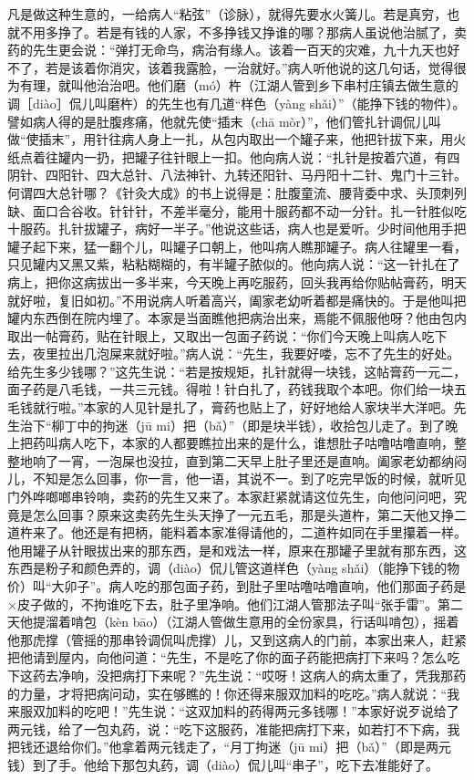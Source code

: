 \documentclass[12pt,UTF8]{ctexbook}
\begin{document}
凡是做这种生意的，一给病人“粘弦”（诊脉），就得先要水火簧儿。若是真穷，也就不用多挣了。若是有钱的人家，不多挣钱又挣谁的哪？那病人虽说他治腻了，卖药的先生更会说：“弹打无命鸟，病治有缘人。该着一百天的灾难，九十九天也好不了，若是该着你消灾，该着我露脸，一治就好。”病人听他说的这几句话，觉得很为有理，就叫他治治吧。他们磨（mó）杵（江湖人管到乡下串村庄镇去做生意的调［diào］侃儿叫磨杵）的先生也有几道“样色（yàng shǎi）”（能挣下钱的物件）。譬如病人得的是肚腹疼痛，他就先使“插末（chā mòr）”，他们管扎针调侃儿叫做“使插末”，用针往病人身上一扎，从包内取出一个罐子来，他把针拔下来，用火纸点着往罐内一扔，把罐子往针眼上一扣。他向病人说：“扎针是按着穴道，有四阴针、四阳针、四大总针、八法神针、九转还阳针、马丹阳十二针、鬼门十三针。何谓四大总针哪？《针灸大成》的书上说得是：肚腹童流、腰背委中求、头顶刺列缺、面口合谷收。针针针，不差半毫分，能用十服药都不动一分针。扎一针胜似吃十服药。扎针拔罐子，病好一半子。”他说这些话，病人也是爱听。少时间他用手把罐子起下来，猛一翻个儿，叫罐子口朝上，他叫病人瞧那罐子。病人往罐里一看，只见罐内又黑又紫，粘粘糊糊的，有半罐子脓似的。他向病人说：“这一针扎在了病上，把你这病拔出一多半来，今天晚上再吃服药，回头我再给你贴帖膏药，明天就好啦，复旧如初。”不用说病人听着高兴，阖家老幼听着都是痛快的。于是他叫把罐内东西倒在院内埋了。本家是当面瞧他把病治出来，焉能不佩服他呀？他由包内取出一帖膏药，贴在针眼上，又取出一包面子药说：“你们今天晚上叫病人吃下去，夜里拉出几泡屎来就好啦。”病人说：“先生，我要好喽，忘不了先生的好处。给先生多少钱哪？”这先生说：“若是按规矩，扎针就得一块钱，这帖膏药一元二，面子药是八毛钱，一共三元钱。得啦！针白扎了，药钱我取个本吧。你们给一块五毛钱就行啦。”本家的人见针是扎了，膏药也贴上了，好好地给人家块半大洋吧。先生治下“柳丁中的拘迷（jū mi）把（bǎ）”（即是块半钱），收拾包儿走了。到了晚上把药叫病人吃下，本家的人都要瞧拉出来的是什么，谁想肚子咕噜咕噜直响，整整地响了一宵，一泡屎也没拉，直到第二天早上肚子里还是直响。阖家老幼都纳闷儿，不知是怎么回事，你一言，他一语，其说不一。到了吃完早饭的时候，就听见门外哗啷啷串铃响，卖药的先生又来了。本家赶紧就请这位先生，向他问问吧，究竟是怎么回事？原来这卖药先生头天挣了一元五毛，那是头道杵，第二天他又挣二道杵来了。他还是有把柄，能料着本家准得请他的，二道杵如同在手里攥着一样。他用罐子从针眼拔出来的那东西，是和戏法一样，原来在那罐子里就有那东西，这东西是粉子和颜色弄的，调（diào）侃儿管这道样色（yàng shǎi）（能挣下钱的物价）叫“大卯子”。病人吃的那包面子药，到肚子里咕噜咕噜直响，他们那面子药是×皮子做的，不拘谁吃下去，肚子里净响。他们江湖人管那法子叫“张手雷”。第二天他提溜着啃包（kèn bāo）（江湖人管做生意用的全份家具，行话叫啃包），摇着他那虎撑（管摇的那串铃调侃叫虎撑）儿，又到这病人的门前，本家出来人，赶紧把他请到屋内，向他问道：“先生，不是吃了你的面子药能把病打下来吗？怎么吃下这药去净响，没把病打下来呢？”先生说：“哎呀！这病人的病太重了，凭我那药的力量，才将把病问动，实在够瞧的！你还得来服双加料的吃吃。”病人就说：“我来服双加料的吃吧！”先生说：“这双加料的药得两元多钱哪！”本家好说歹说给了两元钱，给了一包丸药，说：“吃下这服药，准能把病打下来，如若打不下病，我把钱还退给你们。”他拿着两元钱走了，“月丁拘迷（jū mi）把（bǎ）”（即是两元钱）到了手。他给下那包丸药，调（diào）侃儿叫“串子”，吃下去准能好了。
\end{document}
